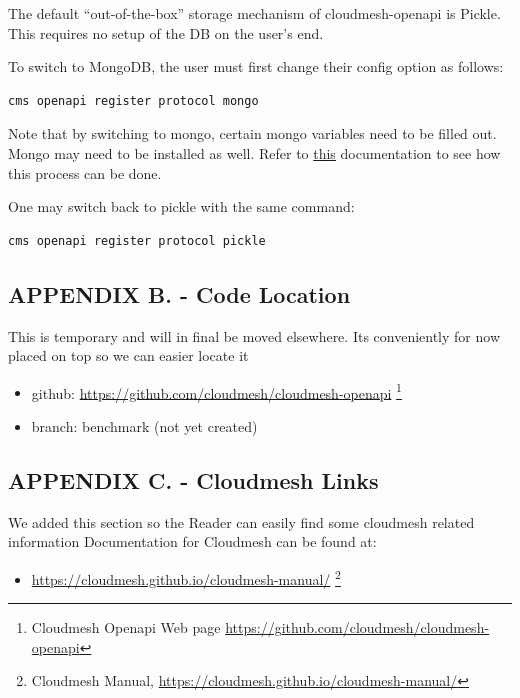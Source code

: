 The default ``out-of-the-box'' storage mechanism of cloudmesh-openapi is
Pickle. This requires no setup of the DB on the user's end.

To switch to MongoDB, the user must first change their config option as
follows:

\begin{verbatim}
cms openapi register protocol mongo
\end{verbatim}

Note that by switching to mongo, certain mongo variables need to be
filled out. Mongo may need to be installed as well. Refer to
\href{https://github.com/cloudmesh/cloudmesh-openapi/\#installation}{this}
documentation to see how this process can be done.

One may switch back to pickle with the same command:

\begin{verbatim}
cms openapi register protocol pickle
\end{verbatim}

\subsection{APPENDIX B. - Code
Location}\label{appendix-b.---code-location}

This is temporary and will in final be moved elsewhere. Its conveniently
for now placed on top so we can easier locate it

\begin{itemize}
\tightlist
\item
  github: \url{https://github.com/cloudmesh/cloudmesh-openapi}
  \footnote{Cloudmesh Openapi Web page
    \url{https://github.com/cloudmesh/cloudmesh-openapi}}
\item
  branch: benchmark (not yet created)
\end{itemize}

\subsection{APPENDIX C. - Cloudmesh
Links}\label{appendix-c.---cloudmesh-links}

We added this section so the Reader can easily find some cloudmesh
related information Documentation for Cloudmesh can be found at:

\begin{itemize}
\tightlist
\item
  \url{https://cloudmesh.github.io/cloudmesh-manual/} \footnote{Cloudmesh
    Manual, \url{https://cloudmesh.github.io/cloudmesh-manual/}}
\end{itemize}


